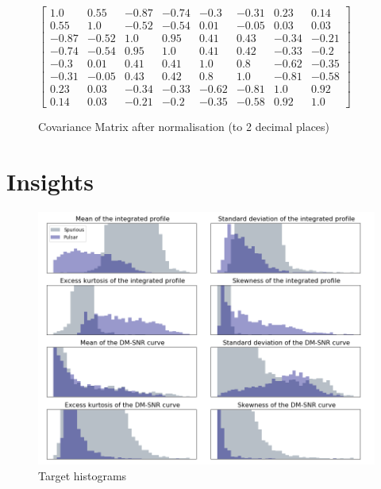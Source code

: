 \documentclass[a4paper,12pt]{article}
\begin{document}
    \setcounter{MaxMatrixCols}{20}
    \begin{figure}[ht!]
        \centering
        \begin{math}
            \begin{bmatrix}
                1.0&0.55&-0.87&-0.74&-0.3&-0.31&0.23&0.14\\
                0.55&1.0&-0.52&-0.54&0.01&-0.05&0.03&0.03\\
                -0.87&-0.52&1.0&0.95&0.41&0.43&-0.34&-0.21\\
                -0.74&-0.54&0.95&1.0&0.41&0.42&-0.33&-0.2\\
                -0.3&0.01&0.41&0.41&1.0&0.8&-0.62&-0.35\\
                -0.31&-0.05&0.43&0.42&0.8&1.0&-0.81&-0.58\\
                0.23&0.03&-0.34&-0.33&-0.62&-0.81&1.0&0.92\\
                0.14&0.03&-0.21&-0.2&-0.35&-0.58&0.92&1.0
            \end{bmatrix}
        \end{math}
        \caption{Covariance Matrix after normalisation (to 2 decimal places)}
    \end{figure}

    \newpage

    \section{Insights}

    \begin{figure}[ht]
        \centering
        \includegraphics[width=\textwidth]{insights}
        \caption{Target histograms}
        \label{fig:insights}
    \end{figure}
\end{document}
